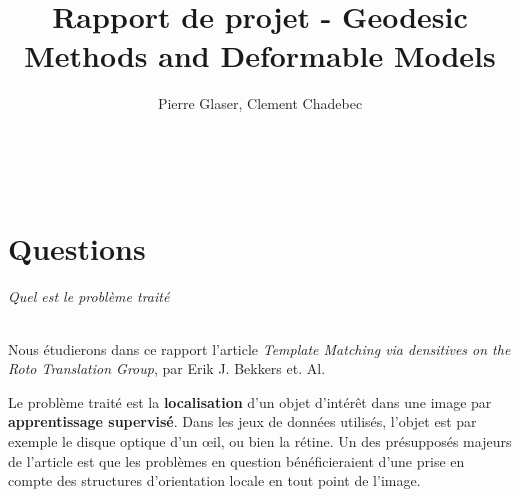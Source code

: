\documentclass{article}
\author{Pierre Glaser, Clement Chadebec}
\title{Rapport de projet - Geodesic Methods and Deformable Models}
\begin{document}
\maketitle
$ \quad $
\part{Questions}


\paragraph{Quel est le problème traité} 
Nous étudierons dans ce rapport l'article \emph{Template Matching via densitives on the
Roto Translation Group}, par Erik J. Bekkers et. Al. \cite{main}

Le problème traité est la \textbf{localisation} d'un objet d'intérêt dans une image par
\textbf{apprentissage supervisé}. Dans les jeux de
données utilisés, l'objet est par exemple le disque optique d'un œil, ou bien la
rétine. Un des présupposés majeurs de l'article est que les problèmes en question bénéficieraient d'une prise en
compte des structures d'orientation locale en tout point de l'image.
\end{document}
